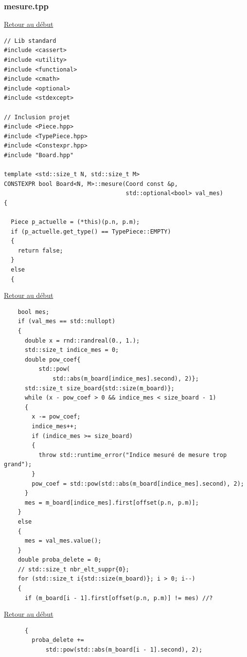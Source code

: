 {\begin{frame}[fragile]
\begin{verbatim}
\end{verbatim}
\end{frame}

\begin{frame}[fragile]
\label{mesure.tpp}
\frametitle{mesure.tpp}
\hyperlink{conclusion}{Retour au début}\newline
\begin{verbatim}
// Lib standard
#include <cassert>
#include <utility>
#include <functional>
#include <cmath>
#include <optional>
#include <stdexcept>

// Inclusion projet
#include <Piece.hpp>
#include <TypePiece.hpp>
#include <Constexpr.hpp>
#include "Board.hpp"

template <std::size_t N, std::size_t M>
CONSTEXPR bool Board<N, M>::mesure(Coord const &p,
                                   std::optional<bool> val_mes)
{

  Piece p_actuelle = (*this)(p.n, p.m);
  if (p_actuelle.get_type() == TypePiece::EMPTY)
  {
    return false;
  }
  else
  {
\end{verbatim}
\end{frame}

\begin{frame}[fragile]
\hyperlink{conclusion}{Retour au début}\newline
\begin{verbatim}
    bool mes;
    if (val_mes == std::nullopt)
    {
      double x = rnd::randreal(0., 1.);
      std::size_t indice_mes = 0;
      double pow_coef{
          std::pow(
              std::abs(m_board[indice_mes].second), 2)};
      std::size_t size_board{std::size(m_board)};
      while (x - pow_coef > 0 && indice_mes < size_board - 1)
      {
        x -= pow_coef;
        indice_mes++;
        if (indice_mes >= size_board)
        {
          throw std::runtime_error("Indice mesuré de mesure trop grand");
        }
        pow_coef = std::pow(std::abs(m_board[indice_mes].second), 2);
      }
      mes = m_board[indice_mes].first[offset(p.n, p.m)];
    }
    else
    {
      mes = val_mes.value();
    }
    double proba_delete = 0;
    // std::size_t nbr_elt_suppr{0};
    for (std::size_t i{std::size(m_board)}; i > 0; i--)
    {
      if (m_board[i - 1].first[offset(p.n, p.m)] != mes) //?
\end{verbatim}
\end{frame}

\begin{frame}[fragile]
\hyperlink{conclusion}{Retour au début}\newline
\begin{verbatim}
      {
        proba_delete +=
            std::pow(std::abs(m_board[i - 1].second), 2);


\end{verbatim}
\end{frame}}
